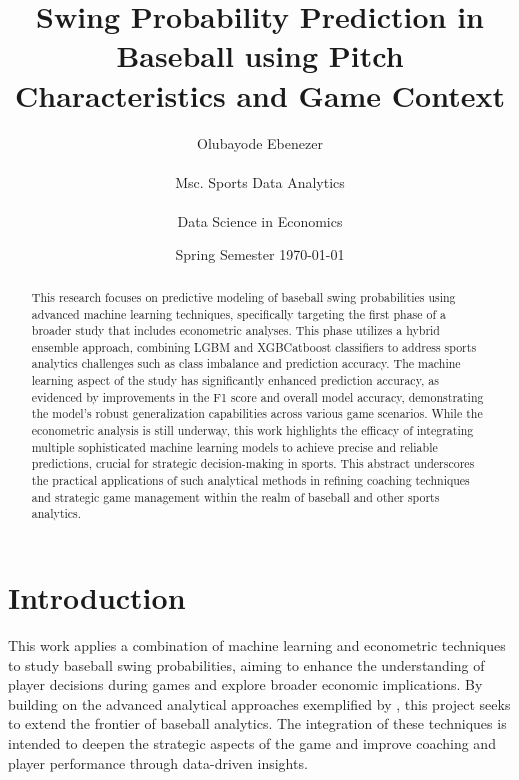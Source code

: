 \documentclass[12pt]{article}
\title{Swing Probability Prediction in Baseball using Pitch Characteristics and Game Context}
\author{Olubayode Ebenezer \\ \\ Msc. Sports Data Analytics\\ 
\\Data Science in Economics}
\date{Spring Semester \today}
\begin{document}
\maketitle


\begin{abstract}
This research focuses on predictive modeling of baseball swing probabilities using advanced machine learning techniques, specifically targeting the first phase of a broader study that includes econometric analyses. This phase utilizes a hybrid ensemble approach, combining LGBM and XGBCatboost classifiers to address sports analytics challenges such as class imbalance and prediction accuracy. The machine learning aspect of the study has significantly enhanced prediction accuracy, as evidenced by improvements in the F1 score and overall model accuracy, demonstrating the model's robust generalization capabilities across various game scenarios. While the econometric analysis is still underway, this work highlights the efficacy of integrating multiple sophisticated machine learning models to achieve precise and reliable predictions, crucial for strategic decision-making in sports. This abstract underscores the practical applications of such analytical methods in refining coaching techniques and strategic game management within the realm of baseball and other sports analytics.
\end{abstract}

\section{Introduction}
This work applies a combination of machine learning and econometric techniques to study baseball swing probabilities, aiming to enhance the understanding of player decisions during games and explore broader economic implications. By building on the advanced analytical approaches exemplified by \cite{Deshpande2023}, this project seeks to extend the frontier of baseball analytics. The integration of these techniques is intended to deepen the strategic aspects of the game and improve coaching and player performance through data-driven insights.
\end{document}

